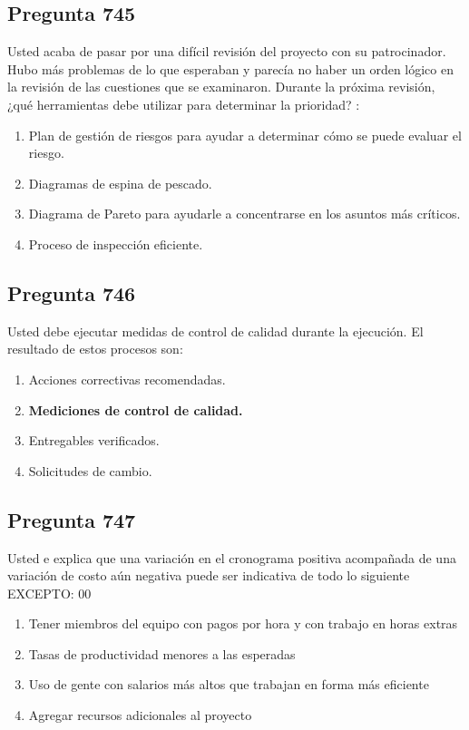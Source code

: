 \documentclass[11pt,a4paper]{article}
\begin{document}
\subsection*{Pregunta 745}
Usted acaba de pasar por una difícil revisión del proyecto con su patrocinador. Hubo más problemas de lo que esperaban y parecía no haber un orden lógico en la revisión de las cuestiones que se examinaron. Durante la próxima revisión, ¿qué herramientas debe utilizar para determinar la prioridad? :

\begin{enumerate}[label=\alph*)]
  \item Plan de gestión de riesgos para ayudar a determinar cómo se puede evaluar el riesgo.
  \item Diagramas de espina de pescado.
  \item Diagrama de Pareto para ayudarle a concentrarse en los asuntos más críticos.
  \item Proceso de inspección eficiente.
\end{enumerate}

\subsection*{Pregunta 746}
Usted debe ejecutar medidas de control de calidad durante la ejecución. El resultado de estos procesos son:

\begin{enumerate}[label=\alph*)]
  \item Acciones correctivas recomendadas.
  \item \textbf{Mediciones de control de calidad.}
  \item Entregables verificados.
  \item Solicitudes de cambio.
\end{enumerate}

\subsection*{Pregunta 747}
Usted e explica que una variación en el cronograma positiva acompañada de una variación de costo aún negativa puede ser indicativa de todo lo siguiente EXCEPTO: 00

\begin{enumerate}[label=\alph*)]
  \item Tener miembros del equipo con pagos por hora y con trabajo en horas extras
  \item Tasas de productividad menores a las esperadas
  \item Uso de gente con salarios más altos que trabajan en forma más eficiente
  \item Agregar recursos adicionales al proyecto
\end{enumerate}
\end{document}
